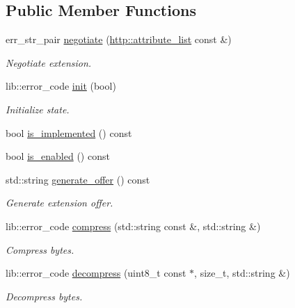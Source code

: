 \subsection*{Public Member Functions}
\begin{DoxyCompactItemize}
\item 
err\+\_\+str\+\_\+pair \hyperlink{classwebsocketpp_1_1extensions_1_1permessage__deflate_1_1disabled_a3de3aad5ffeef60e3713cc29dec7b140}{negotiate} (\hyperlink{namespacewebsocketpp_1_1http_a9744f4104772b987aa9e86c35ce1357b}{http\+::attribute\+\_\+list} const \&)
\begin{DoxyCompactList}\small\item\em Negotiate extension. \end{DoxyCompactList}\item 
lib\+::error\+\_\+code \hyperlink{classwebsocketpp_1_1extensions_1_1permessage__deflate_1_1disabled_afe11662b31612191d72558fa7db5c114}{init} (bool)
\begin{DoxyCompactList}\small\item\em Initialize state. \end{DoxyCompactList}\item 
bool \hyperlink{classwebsocketpp_1_1extensions_1_1permessage__deflate_1_1disabled_ac69a4d4c4caafc58c5a1099329680185}{is\+\_\+implemented} () const 
\item 
bool \hyperlink{classwebsocketpp_1_1extensions_1_1permessage__deflate_1_1disabled_a73952093f84aa662b1a84d42ae87b9fb}{is\+\_\+enabled} () const 
\item 
std\+::string \hyperlink{classwebsocketpp_1_1extensions_1_1permessage__deflate_1_1disabled_a5e718e8e4a6f2917446791e5e2fe448f}{generate\+\_\+offer} () const 
\begin{DoxyCompactList}\small\item\em Generate extension offer. \end{DoxyCompactList}\item 
lib\+::error\+\_\+code \hyperlink{classwebsocketpp_1_1extensions_1_1permessage__deflate_1_1disabled_a3ef2c3020ea3b8d531d3cee03bf8eadf}{compress} (std\+::string const \&, std\+::string \&)
\begin{DoxyCompactList}\small\item\em Compress bytes. \end{DoxyCompactList}\item 
lib\+::error\+\_\+code \hyperlink{classwebsocketpp_1_1extensions_1_1permessage__deflate_1_1disabled_ad72b694d8ce4c7e39c055ee2008810b6}{decompress} (uint8\+\_\+t const $\ast$, size\+\_\+t, std\+::string \&)
\begin{DoxyCompactList}\small\item\em Decompress bytes. \end{DoxyCompactList}\end{DoxyCompactItemize}


